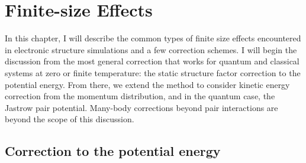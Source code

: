 \chapter{Finite-size Effects}

In this chapter, I will describe the common types of finite size effects encountered in electronic structure simulations and a few correction schemes. I will begin the discussion from the most general correction that works for quantum and classical systems at zero or finite temperature: the static structure factor correction to the potential energy. From there, we extend the method to consider kinetic energy correction from the momentum distribution, and in the quantum case, the Jastrow pair potential. %
Many-body corrections beyond pair interactions are beyond the scope of this discussion.

\section{Correction to the potential energy}

